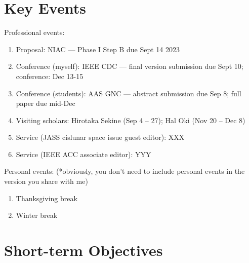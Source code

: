 \documentclass{article}
\begin{document}
\section{Key Events}
\noindent
Professional events:
\begin{enumerate}
\item 
Proposal: NIAC --- Phase I Step B due Sept 14 2023
\item 
Conference (myself): IEEE CDC --- final version submission due Sept 10; conference: Dec 13-15
\item 
Conference (students): AAS GNC --- abstract submission due Sep 8; full paper due mid-Dec
\item 
Visiting scholars: Hirotaka Sekine (Sep 4 -- 27);  Hal Oki (Nov 20 -- Dec 8)
\item 
Service (JASS cislunar space issue guest editor): XXX
\item 
Service (IEEE ACC associate editor): YYY
\end{enumerate}

\noindent
Personal events:
\hfill (*obviously, you don't need to include personal events in the version you share with me)
\begin{enumerate}
\item 
Thanksgiving break
\item 
Winter break
\end{enumerate}

\section{Short-term Objectives}
\end{document}
